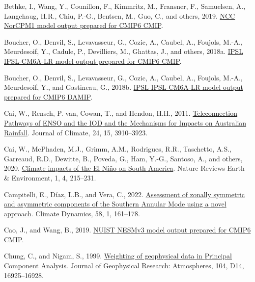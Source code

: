 \documentclass[12pt,oneside]{reedthesis}
\newlength{\cslhangindent}
\newenvironment{CSLReferences}[2] %
 {%
  \setlength{\parindent}{0pt}
  \ifodd #1 \everypar{\setlength{\hangindent}{\cslhangindent}}\ignorespaces\fi
  \ifnum #2 > 0
  \setlength{\parskip}{#2\baselineskip}
  \fi
 }%
 {}
\begin{document}
\begin{CSLReferences}{1}{0}
\leavevmode{}%
Bethke, I., Wang, Y., Counillon, F., Kimmritz, M., Fransner, F., Samuelsen, A., Langehaug, H.R., Chiu, P.-G., Bentsen, M., Guo, C., and others, 2019. \href{https://doi.org/10.22033/ESGF/CMIP6.10843}{NCC NorCPM1 model output prepared for CMIP6 CMIP}.

\leavevmode{}%
Boucher, O., Denvil, S., Levavasseur, G., Cozic, A., Caubel, A., Foujols, M.-A., Meurdesoif, Y., Cadule, P., Devilliers, M., Ghattas, J., and others, 2018a. \href{https://doi.org/10.22033/ESGF/CMIP6.1534}{IPSL IPSL-CM6A-LR model output prepared for CMIP6 CMIP}.

\leavevmode{}%
Boucher, O., Denvil, S., Levavasseur, G., Cozic, A., Caubel, A., Foujols, M.-A., Meurdesoif, Y., and Gastineau, G., 2018b. \href{https://doi.org/10.22033/ESGF/CMIP6.13801}{IPSL IPSL-CM6A-LR model output prepared for CMIP6 DAMIP}.

\leavevmode{}%
Cai, W., Rensch, P. van, Cowan, T., and Hendon, H.H., 2011. \href{https://doi.org/10.1175/2011JCLI4129.1}{Teleconnection {Pathways} of {ENSO} and the {IOD} and the {Mechanisms} for {Impacts} on {Australian Rainfall}}. Journal of Climate, 24, 15, 3910--3923.

\leavevmode{}%
Cai, W., McPhaden, M.J., Grimm, A.M., Rodrigues, R.R., Taschetto, A.S., Garreaud, R.D., Dewitte, B., Poveda, G., Ham, Y.-G., Santoso, A., and others, 2020. \href{https://doi.org/10.1038/s43017-020-0040-3}{Climate impacts of the {El Niño} on {South America}}. Nature Reviews Earth \& Environment, 1, 4, 215--231.

\leavevmode{}%
Campitelli, E., Díaz, L.B., and Vera, C., 2022. \href{https://doi.org/10.1007/s00382-021-05896-5}{Assessment of zonally symmetric and asymmetric components of the {Southern Annular Mode} using a novel approach}. Climate Dynamics, 58, 1, 161--178.

\leavevmode{}%
Cao, J., and Wang, B., 2019. \href{https://doi.org/10.22033/ESGF/CMIP6.2021}{NUIST NESMv3 model output prepared for CMIP6 CMIP}.

\leavevmode{}%
Chung, C., and Nigam, S., 1999. \href{https://doi.org/10.1029/1999JD900234}{Weighting of geophysical data in {Principal Component Analysis}}. Journal of Geophysical Research: Atmospheres, 104, D14, 16925--16928.


\end{CSLReferences}
\end{document}
